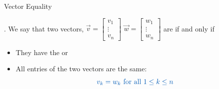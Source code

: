 \documentclass[xcoler=dvipsnames, aspectratio=169]{beamer}
\begin{document}
    \begin{frame}{Vector Equality}
        \begin{defn}
            . We say that two vectors,
            $\vec{v} = \begin{bmatrix}v_1\\\vdots\\v_n\end{bmatrix}$
            $\vec{w} = \begin{bmatrix}w_1\\\vdots\\w_n\end{bmatrix}$ are  if and only if
                \pause
                \begin{itemize}
                    \item They have the  or
                        \pause
                    \item All entries of the two vectors are the same:
                        \[
                            \bText{v_k = w_k\text{ for all }1\leq k\leq n}
                        \]
                \end{itemize}
        \end{defn}
    \end{frame}
\end{document}
